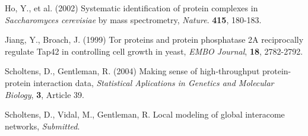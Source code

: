 \documentclass[11pt]{article}
\begin{document}
\noindent Ho, Y., et al. (2002) Systematic identification of protein complexes
in \textit{Saccharomyces cerevisiae} by mass spectrometry,
\textit{Nature}. \textbf{415}, 180-183.

\vspace{.2in}

\noindent Jiang, Y., Broach, J. (1999) Tor proteins and protein phosphatase
2A reciprocally regulate Tap42 in controlling cell growth in yeast,
\textit{EMBO Journal}, \textbf{18}, 2782-2792.

\vspace{.2in}

\noindent Scholtens, D., Gentleman, R. (2004) Making sense of high-throughput
protein-protein interaction data, \textit{Statistical Aplications in Genetics
and Molecular Biology}, \textbf{3}, Article 39.

\vspace{.2in}

\noindent Scholtens, D., Vidal, M., Gentleman, R.  Local modeling of global
interacome networks, \textit{Submitted}.
\end{document}
